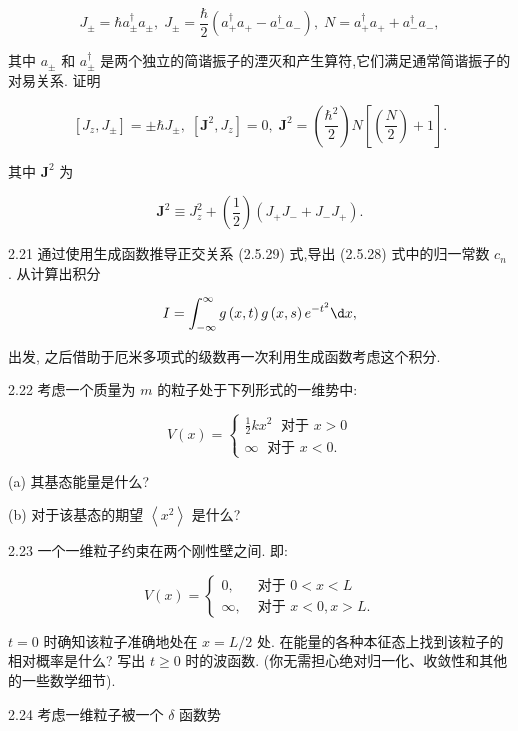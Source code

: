 $$
{J}_{ \pm } = \hbar {a}_{ \pm }^{ \dagger }{a}_{ \pm },\;{J}_{ \pm } = \frac{\hbar }{2}\left( {{a}_{ + }^{ \dagger }{a}_{ + } - {a}_{ - }^{ \dagger }{a}_{ - }}\right) ,\;N = {a}_{ + }^{ \dagger }{a}_{ + } + {a}_{ - }^{ \dagger }{a}_{ - },
$$

其中 ${a}_{ \pm }$ 和 ${a}_{ \pm }^{ \dagger }$ 是两个独立的简谐振子的湮灭和产生算符,它们满足通常简谐振子的对易关系. 证明

$$
\left\lbrack {{J}_{z},{J}_{ \pm }}\right\rbrack = \pm \hbar {J}_{ \pm },\;\left\lbrack {{\mathbf{J}}^{2},{J}_{z}}\right\rbrack = 0,\;{\mathbf{J}}^{2} = \left( \frac{{\hbar }^{2}}{2}\right) N\left\lbrack {\left( \frac{N}{2}\right) + 1}\right\rbrack .
$$

其中 ${\mathbf{J}}^{2}$ 为

$$
{\mathbf{J}}^{2} \equiv {J}_{z}^{2} + \left( \frac{1}{2}\right) \left( {{J}_{ + }{J}_{ - } + {J}_{ - }{J}_{ + }}\right) .
$$

2.21 通过使用生成函数推导正交关系 (2.5.29) 式,导出 (2.5.28) 式中的归一常数 ${c}_{n}$ . 从计算出积分

$$
I = \int_{-\infty }^{\infty }g\left( {x, t}\right) g\left( {x, s}\right) {e}^{-{t}^{2}}{\d x},
$$

出发, 之后借助于厄米多项式的级数再一次利用生成函数考虑这个积分.

2.22 考虑一个质量为 $m$ 的粒子处于下列形式的一维势中:

$$
V\left( x\right) = \left\{ \begin{array}{l} \frac{1}{2}k{x}^{2}\;\text{ 对于 }x > 0 \\ \infty \;\text{ 对于 }x < 0. \end{array}\right.
$$

(a) 其基态能量是什么?

(b) 对于该基态的期望 $\left\langle {x}^{2}\right\rangle$ 是什么?

2.23 一个一维粒子约束在两个刚性壁之间. 即:

$$
V\left( x\right) = \left\{ \begin{array}{ll} 0, & \text{ 对于 }0 < x < L \\ \infty , & \text{ 对于 }x < 0, x > L. \end{array}\right.
$$

$t = 0$ 时确知该粒子准确地处在 $x = L/2$ 处. 在能量的各种本征态上找到该粒子的相对概率是什么? 写出 $t \geq 0$ 时的波函数. (你无需担心绝对归一化、收敛性和其他的一些数学细节).

2.24 考虑一维粒子被一个 $\delta$ 函数势

